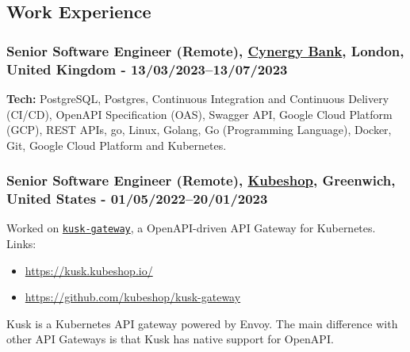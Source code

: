 \documentclass[
  a4paper,
]{article}
\providecommand{\tightlist}{%
  \setlength{\itemsep}{0pt}\setlength{\parskip}{0pt}}
\begin{document}
\begin{multicols*}{2}

\hypertarget{work-experience}{%
\subsection{Work Experience}\label{work-experience}}

\hypertarget{senior-software-engineer-remote-cynergy-bank-london-united-kingdom---1303202313072023}{%
\subsubsection{\texorpdfstring{Senior Software Engineer (Remote),
\href{https://cynergybank.co.uk}{Cynergy Bank}, London, United Kingdom -
13/03/2023--13/07/2023}{Senior Software Engineer (Remote), Cynergy Bank, London, United Kingdom - 13/03/2023--13/07/2023}}\label{senior-software-engineer-remote-cynergy-bank-london-united-kingdom---1303202313072023}}

\textbf{Tech:} PostgreSQL, Postgres, Continuous Integration and
Continuous Delivery (CI/CD), OpenAPI Specification (OAS), Swagger API,
Google Cloud Platform (GCP), REST APIs, go, Linux, Golang, Go
(Programming Language), Docker, Git, Google Cloud Platform and
Kubernetes.

\hypertarget{senior-software-engineer-remote-kubeshop-greenwich-united-states---0105202220012023}{%
\subsubsection{\texorpdfstring{Senior Software Engineer (Remote),
\href{https://kubeshop.io/}{Kubeshop}, Greenwich, United States -
01/05/2022--20/01/2023}{Senior Software Engineer (Remote), Kubeshop, Greenwich, United States - 01/05/2022--20/01/2023}}\label{senior-software-engineer-remote-kubeshop-greenwich-united-states---0105202220012023}}

Worked on \href{https://docs.kusk.io/}{\texttt{kusk-gateway}}, a
OpenAPI-driven API Gateway for Kubernetes. Links:

\begin{itemize}
\tightlist
\item
  \url{https://kusk.kubeshop.io/}
\item
  \url{https://github.com/kubeshop/kusk-gateway}
\end{itemize}

Kusk is a Kubernetes API gateway powered by Envoy. The main difference
with other API Gateways is that Kusk has native support for OpenAPI.


\end{multicols*}
\end{document}
